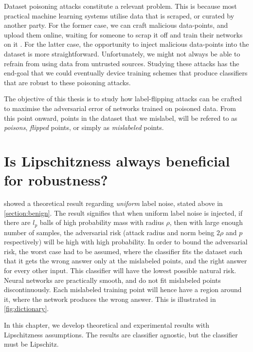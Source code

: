 \documentclass{ociamthesis}
\begin{document}
Dataset poisoning attacks constitute a relevant problem. This is because most
practical machine learning systems utilise data that is scraped, or curated by
another party. For the former case, we can craft malicious data-points, and
upload them online, waiting for someone to scrap it off and train their networks
on it \citep{transferable-clean-label-poisoning}. For the latter case, the
opportunity to inject malicious data-points into the dataset is more
straightforward. Unfortunately, we might not always be able to refrain from
using data from untrusted sources. Studying these attacks has the end-goal that
we could eventually device training schemes that produce classifiers that are
robust to these poisoning attacks.

The objective of this thesis is to study how label-flipping attacks can be
crafted to maximise the adversarial error of networks trained on poisoned data.
From this point onward, points in the dataset that we mislabel, will be refered
to as \emph{poisons}, \emph{flipped} points, or simply as \emph{mislabeled}
points.


\chapter{Is Lipschitzness always beneficial for robustness?}
\label{section:Lipschitzness-assumption}

\citet{sanyal2021how} showed a theoretical result regarding \emph{uniform} label
noise, stated above in \cref{section:benign}. The result signifies that when
uniform label noise is injected, if there are $l_p$ balls of high probability
mass with radius $\rho$, then with large enough number of samples, the
adversarial risk (attack radius and norm being $2\rho$ and $p$ respectively)
will be high with high probability. In order to bound the adversarial risk, the
worst case had to be assumed, where the classifier fits the dataset such that it
gets the wrong answer only at the mislabeled points, and the right answer for
every other input. This classifier will have the lowest possible natural risk.
Neural networks are practically smooth, and do not fit mislabeled points
discontinuously. Each mislabeled training point will hence have a region around
it, where the network produces the wrong answer. This is illustrated in
\cref{fig:dictionary}.

In this chapter, we develop theoretical and experimental results with
Lipschitzness assumptions. The results are classifier agnostic, but the
classifier must be Lipschitz.
\end{document}
